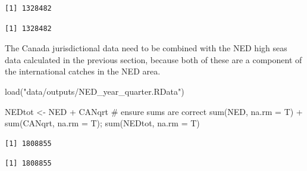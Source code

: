 \documentclass[
  letterpaper,
  oneside,
  open=any]{scrbook}
\newenvironment{Shaded}{\begin{snugshade}}{\end{snugshade}}
\newcommand{\AttributeTok}[1]{\textcolor[rgb]{0.40,0.45,0.13}{#1}}
\newcommand{\CommentTok}[1]{\textcolor[rgb]{0.37,0.37,0.37}{#1}}
\newcommand{\FunctionTok}[1]{\textcolor[rgb]{0.28,0.35,0.67}{#1}}
\newcommand{\NormalTok}[1]{\textcolor[rgb]{0.00,0.23,0.31}{#1}}
\newcommand{\OtherTok}[1]{\textcolor[rgb]{0.00,0.23,0.31}{#1}}
\newcommand{\SpecialCharTok}[1]{\textcolor[rgb]{0.37,0.37,0.37}{#1}}
\newcommand{\StringTok}[1]{\textcolor[rgb]{0.13,0.47,0.30}{#1}}
\begin{document}
\begin{verbatim}
[1] 1328482
\end{verbatim}

\begin{verbatim}
[1] 1328482
\end{verbatim}

The Canada jurisdictional data need to be combined with the NED high
seas data calculated in the previous section, because both of these are
a component of the international catches in the NED area.

\begin{Shaded}
\begin{Highlighting}[]
\FunctionTok{load}\NormalTok{(}\StringTok{"data/outputs/NED\_year\_quarter.RData"}\NormalTok{)}

\NormalTok{NEDtot }\OtherTok{\textless{}{-}}\NormalTok{ NED }\SpecialCharTok{+}\NormalTok{ CANqrt}
\CommentTok{\# ensure sums are correct}
\FunctionTok{sum}\NormalTok{(NED, }\AttributeTok{na.rm =}\NormalTok{ T) }\SpecialCharTok{+} \FunctionTok{sum}\NormalTok{(CANqrt, }\AttributeTok{na.rm =}\NormalTok{ T); }\FunctionTok{sum}\NormalTok{(NEDtot, }\AttributeTok{na.rm =}\NormalTok{ T)}
\end{Highlighting}
\end{Shaded}

\begin{verbatim}
[1] 1808855
\end{verbatim}

\begin{verbatim}
[1] 1808855
\end{verbatim}
\end{document}
